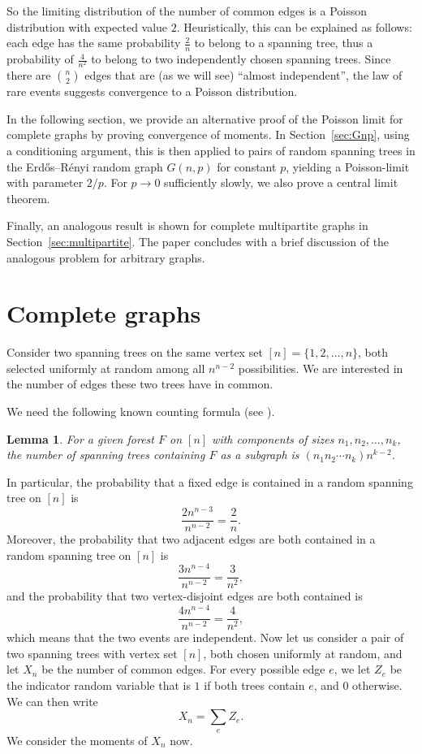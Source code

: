 \documentclass[a4paper,12pt,reqno]{amsart}
\newtheorem{lemma}{Lemma}
\theoremstyle{remark}
\begin{document}
So the limiting distribution of the number of common edges is a Poisson distribution with expected value $2$. Heuristically, this can be explained as follows: each edge has the same probability $\frac{2}{n}$ to belong to a spanning tree, thus a probability of $\frac{4}{n^2}$ to belong to two independently chosen spanning trees. Since there are $\binom{n}{2}$ edges that are (as we will see) ``almost independent'', the law of rare events suggests convergence to a Poisson distribution.

In the following section, we provide an alternative proof of the Poisson limit for complete graphs by proving convergence of moments. In Section~\ref{sec:Gnp}, using a conditioning argument, this is then applied to pairs of random spanning trees in the Erd\H{o}s--R\'enyi random graph $G(n,p)$ for constant $p$, yielding a Poisson-limit with parameter $2/p$. For $p\to 0$ sufficiently slowly, we also prove a central limit theorem.

Finally, an analogous result is shown for complete multipartite graphs in Section~\ref{sec:multipartite}. The paper concludes with a brief discussion of the analogous problem for arbitrary graphs.


\section{Complete graphs}

Consider two spanning trees on the same vertex set $[n] = \{1,2,\ldots,n\}$, both selected uniformly at random among all $n^{n-2}$ possibilities. We are interested in the number of edges these two trees have in common.

We need the following known counting formula (see \cite{cameron,moon}). 

\begin{lemma}\label{lem:given_components}
For a given forest $F$ on $[n]$ with components of sizes $n_1,n_2,\ldots,n_k$, the number of spanning trees containing $F$ as a subgraph is $(n_1n_2 \cdots n_k) n^{k-2}$.
\end{lemma}
In particular, the probability that a fixed edge is contained in a random spanning tree on $[n]$ is
\begin{equation} \label{average} \frac{2 n^{n-3}}{n^{n-2}} = \frac{2}{n}.\end{equation}
Moreover, the probability that two adjacent edges are both contained in a random spanning tree on $[n]$ is
\[\frac{3 n^{n-4}}{n^{n-2}} = \frac{3}{n^2},\]
and the probability that two vertex-disjoint edges are both contained is
\[\frac{4n^{n-4}}{n^{n-2}} = \frac{4}{n^2},\]
which means that the two events are independent. Now let us consider a pair of two spanning trees with vertex set $[n]$, both chosen uniformly at random, and let $X_n$ be the number of common edges. For every possible edge $e$, we let $Z_e$ be the indicator random variable that is $1$ if both trees contain $e$, and $0$ otherwise. We can then write
\begin{equation}\label{eq:sum_of_ind}
X_n = \sum_e Z_e.
\end{equation}
We consider the moments of $X_n$ now.
\end{document}
